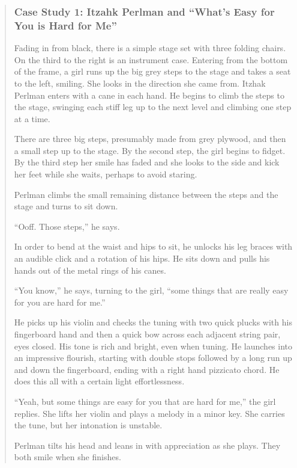 \documentclass[12pt,letterpaper]{article}
\begin{document}
	\begin{quote}
	\subsubsection*{Case Study 1: Itzahk Perlman and ``What's Easy for You
	 is Hard for Me''}

	Fading in from black, there is a simple stage set with three folding 
	chairs. On the third to the right is an instrument case. Entering from 
	the bottom of the frame, a girl runs up the big grey steps to the stage 
	and takes a seat to the left, smiling. She looks in the direction she 
	came from. Itzhak Perlman enters with a cane in each hand. He begins 
	to climb the steps to the stage, swinging each stiff leg up to the next
	level and climbing one step at a time. 

	There are three big steps, presumably made from grey plywood, and then a
	small step up to the stage. By the second step, the girl begins to 
	fidget. By the third step her smile has faded and she looks to the side
	and kick her feet while she waits, perhaps to avoid staring.   

	Perlman climbs the small remaining distance between the steps and the 
	stage and turns to sit down. 

	``Ooff. Those steps,'' he says.

	In order to bend at the waist and hips to sit, he unlocks his leg 
	braces with an audible click and a rotation of his hips. He sits down 
	and pulls his hands out of the metal rings of his canes.

	``You know,'' he says, turning to the girl, ``some things that are 
	really easy for you are hard for me.''

	He picks up his violin and checks the tuning with two quick plucks with 
	his fingerboard hand and then a quick bow across each adjacent string
	pair, eyes closed. His tone is rich and bright, even when tuning. He 
	launches into an impressive flourish, starting with double stops 
	followed by a long run up and down the fingerboard, ending with a right
	hand pizzicato chord. He does this all with a certain light 
	effortlessness.

	``Yeah, but some things are easy for you that are hard for me,'' the 
	girl replies. She lifts her violin and plays a melody in a minor key.
	She 
	carries the tune, but her intonation is unstable. 

	Perlman tilts his head and leans in with appreciation as she plays.
	They both smile when she finishes.   

	\end{quote}
\end{document}
